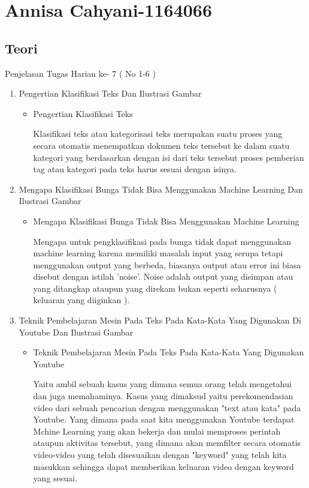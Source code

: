 \section{Annisa Cahyani-1164066}
\subsection{Teori}
Penjelasan Tugas Harian ke- 7 ( No 1-6 )
\begin{enumerate}
\item Pengertian Klasifikasi Teks Dan Ilustrasi Gambar
\begin{itemize}
\item Pengertian Klasifikasi Teks
\par Klasifikasi teks atau kategorisasi teks merupakan suatu proses yang secara otomatis menempatkan dokumen teks tersebut ke dalam suatu kategori yang berdasarkan dengan isi dari teks tersebut proses pemberian tag atau kategori pada teks harus sesuai dengan isinya. 
\par
\end{itemize}
\par
\par
\item Mengapa Klasifikasi Bunga Tidak Bisa Menggunakan Machine Learning Dan Ilustrasi Gambar
\begin{itemize}
\item  Mengapa Klasifikasi Bunga Tidak Bisa Menggunakan Machine Learning
\par Mengapa untuk pengklasifikasi pada bunga tidak dapat menggunakan machine learning karena memiliki masalah input yang serupa tetapi menggunakan output yang berbeda, biasanya output atau error ini biasa  disebut dengan istilah 'noise'. Noise adalah output yang disimpan atau yang ditangkap ataupun yang direkam bukan seperti seharusnya ( keluaran yang diiginkan ). 
\par
\end{itemize}
\par
\par
\item Teknik Pembelajaran Mesin Pada Teks Pada Kata-Kata Yang Digunakan Di Youtube Dan Ilustrasi Gambar
\begin{itemize}
\item  Teknik Pembelajaran Mesin Pada Teks Pada Kata-Kata Yang Digunakan Youtube
\par Yaitu ambil sebuah kasus yang  dimana semua orang telah mengetahui dan juga memahaminya. Kasus yang dimaksud  yaitu perekomendasian video dari sebuah  pencarian dengan menggunakan "text atau kata" pada  Youtube. Yang dimana pada saat kita menggunakan Youtube terdapat Mchine Learning yang akan bekerja dan mulai memproses perintah ataupun aktivitas tersebut, yang  dimana akan memfilter secara otomatis video-video yang telah disesuaikan dengan "keyword" yang telah kita masukkan sehingga dapat memberikan keluaran video dengan keyword yang sesuai.  

\end{itemize}
\end{enumerate}
